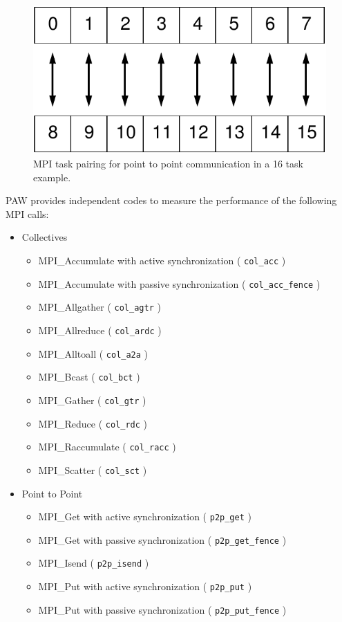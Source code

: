 \documentclass[10pt,a4paper]{report}
\begin{document}
\begin{figure}[ht!]
	\centering
	\includegraphics[width=0.5\columnwidth]{figures/mpi_config.pdf}
	\caption{MPI task pairing for point to point communication in a 16 task example.}
	\label{fig:mpi_test_config}
\end{figure}

PAW provides independent codes to measure the performance of the following MPI calls:

\begin{itemize}
\item{Collectives}
\begin{itemize}
    \item{MPI\_Accumulate with active synchronization ( \texttt{col\_acc} )}
    \item{MPI\_Accumulate with passive synchronization ( \texttt{col\_acc\_fence} )}
	\item{MPI\_Allgather ( \texttt{col\_agtr} )}
	\item{MPI\_Allreduce ( \texttt{col\_ardc} )}
	\item{MPI\_Alltoall ( \texttt{col\_a2a} )}
	\item{MPI\_Bcast ( \texttt{col\_bct} )}
	\item{MPI\_Gather ( \texttt{col\_gtr} )}
	\item{MPI\_Reduce ( \texttt{col\_rdc} )}
	\item{MPI\_Raccumulate ( \texttt{col\_racc} )}
	\item{MPI\_Scatter ( \texttt{col\_sct} )}
\end{itemize}
\item{Point to Point}
\begin{itemize}
	\item{MPI\_Get with active synchronization ( \texttt{p2p\_get} )}
	\item{MPI\_Get with passive synchronization ( \texttt{p2p\_get\_fence} )}
	\item{MPI\_Isend ( \texttt{p2p\_isend} )}
	\item{MPI\_Put with active synchronization ( \texttt{p2p\_put} )}
	\item{MPI\_Put with passive synchronization ( \texttt{p2p\_put\_fence} )}

\end{itemize}
\end{itemize}
\end{document}
